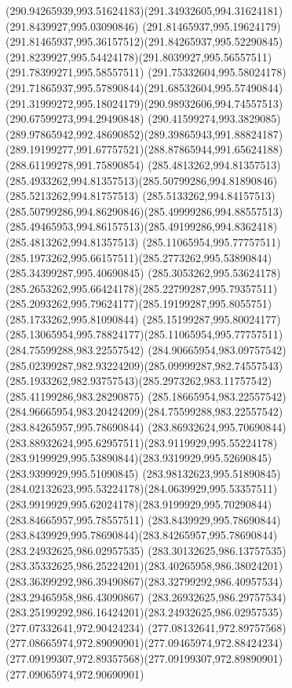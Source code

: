 {{  \curveto(290.94265939,993.51624183)(291.34932605,994.31624181)(291.8439927,995.03090846)
  \curveto(291.81465937,995.19624179)(291.81465937,995.36157512)(291.84265937,995.52290845)
  \curveto(291.8239927,995.54424178)(291.8039927,995.56557511)(291.78399271,995.58557511)
  \curveto(291.75332604,995.58024178)(291.71865937,995.57890844)(291.68532604,995.57490844)
  \curveto(291.31999272,995.18024179)(290.98932606,994.74557513)(290.67599273,994.29490848)
  \curveto(290.41599274,993.3829085)(289.97865942,992.48690852)(289.39865943,991.88824187)
  \curveto(289.19199277,991.67757521)(288.87865944,991.65624188)(288.61199278,991.75890854)
  \moveto(285.4813262,994.81357513)
  \curveto(285.4933262,994.81357513)(285.50799286,994.81890846)(285.5213262,994.81757513)
  \curveto(285.5133262,994.84157513)(285.50799286,994.86290846)(285.49999286,994.88557513)
  \curveto(285.49465953,994.86157513)(285.49199286,994.8362418)(285.4813262,994.81357513)
  \moveto(285.11065954,995.77757511)
  \curveto(285.1973262,995.66157511)(285.2773262,995.53890844)(285.34399287,995.40690845)
  \curveto(285.3053262,995.53624178)(285.2653262,995.66424178)(285.22799287,995.79357511)
  \curveto(285.2093262,995.79624177)(285.19199287,995.8055751)(285.1733262,995.81090844)
  \curveto(285.15199287,995.80024177)(285.13065954,995.78824177)(285.11065954,995.77757511)
  \moveto(284.75599288,983.22557542)
  \curveto(284.90665954,983.09757542)(285.02399287,982.93224209)(285.09999287,982.74557543)
  \curveto(285.1933262,982.93757543)(285.2973262,983.11757542)(285.41199286,983.28290875)
  \curveto(285.18665954,983.22557542)(284.96665954,983.20424209)(284.75599288,983.22557542)
  \moveto(283.84265957,995.78690844)
  \curveto(283.86932624,995.70690844)(283.88932624,995.62957511)(283.9119929,995.55224178)
  \curveto(283.9199929,995.53890844)(283.9319929,995.52690845)(283.9399929,995.51090845)
  \curveto(283.98132623,995.51890845)(284.02132623,995.53224178)(284.0639929,995.53357511)
  \curveto(283.9919929,995.62024178)(283.9199929,995.70290844)(283.84665957,995.78557511)
  \curveto(283.8439929,995.78690844)(283.8439929,995.78690844)(283.84265957,995.78690844)
  \moveto(283.24932625,986.02957535)
  \curveto(283.30132625,986.13757535)(283.35332625,986.25224201)(283.40265958,986.38024201)
  \curveto(283.36399292,986.39490867)(283.32799292,986.40957534)(283.29465958,986.43090867)
  \curveto(283.26932625,986.29757534)(283.25199292,986.16424201)(283.24932625,986.02957535)
  \moveto(277.07332641,972.90424234)
  \curveto(277.08132641,972.89757568)(277.08665974,972.89090901)(277.09465974,972.88424234)
  \curveto(277.09199307,972.89357568)(277.09199307,972.89890901)(277.09065974,972.90690901)
}}

